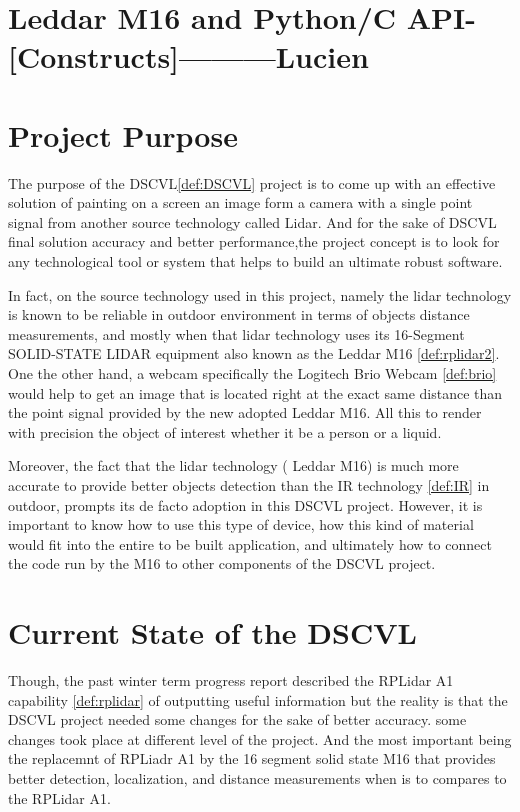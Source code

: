 \documentclass[onecolumn, draftclsnofoot,10pt, compsoc]{IEEEtran}
\begin{document}
\begin{singlespace}
	
	
	\section{ Leddar M16 and Python/C API- [Constructs]---------Lucien}
				
	\section{Project Purpose}
The purpose of the DSCVL\ref{def:DSCVL} project is to come up with an effective solution of painting on a screen an image form a camera with a single point signal from another source technology called Lidar. And for the sake of DSCVL final solution accuracy and better performance,the project concept is to look for any technological tool or system that helps to build an ultimate robust software.

 In fact, on the source technology used in this project, namely the  lidar technology is known to be reliable in outdoor environment in terms of objects distance measurements, and mostly when that lidar technology uses its  16-Segment SOLID-STATE LIDAR equipment also known as the Leddar M16 \ref{def:rplidar2}. One the other hand, a webcam specifically the Logitech Brio Webcam \ref{def:brio} would help to get an image that is located right at the exact same distance than the point signal provided by the new adopted Leddar M16. All this to render with precision the object of interest whether it be a person or a liquid.
 
Moreover, the fact that the lidar technology ( Leddar M16) is much more accurate to provide better objects detection than the IR technology \ref{def:IR} in outdoor, prompts  its de facto adoption in this DSCVL project. However, it is important to know how to use this type of device, how this kind of material would fit into the entire to be built application, and ultimately how to connect the code run by the M16 to other components of the DSCVL project. \par

\section{Current State of the DSCVL}
Though, the past winter term progress report described the RPLidar A1 capability  \ref{def:rplidar} of outputting  useful information but the reality is that the DSCVL project  needed some changes for the sake of better accuracy. some changes took place at different level of the project. And the most important being the replacemnt of RPLiadr A1 by the 16 segment solid state M16 that provides better detection, localization, and distance measurements when is to compares to the RPLidar A1.\par


\end{singlespace}
\end{document}
